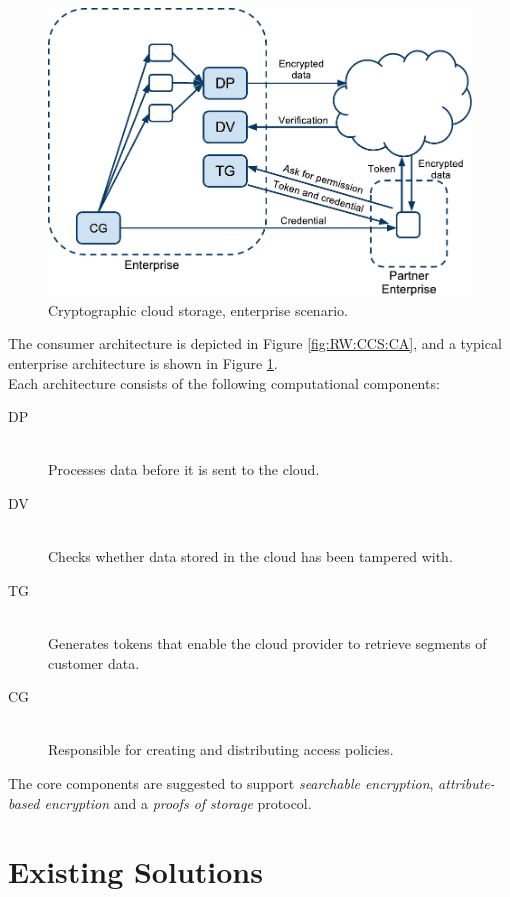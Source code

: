 \documentclass[pdftex,english,10pt,b5paper,twoside]{book}
\begin{document}
\begin{figure}[h!]
    \centering
    \includegraphics[scale=0.6]{ArchitectureCCSE.pdf}
    \caption{Cryptographic cloud storage, enterprise scenario.}
    \label{fig:RW:CCS:EA}
\end{figure}

The consumer architecture is depicted in Figure \ref{fig:RW:CCS:CA}, and a typical
enterprise architecture is shown in Figure \ref{fig:RW:CCS:EA}.\\

\noindent Each architecture consists of the following computational components:
\begin{description}
  \item[\ac{DP}] \hfill \\Processes data before it is sent to the cloud.
  \item[\ac{DV}] \hfill \\Checks whether data stored in the cloud has been
  tampered with.
  \item[\ac{TG}] \hfill \\Generates tokens that enable the cloud provider to
  retrieve segments of customer data.
  \item[\ac{CG}] \hfill \\Responsible for creating and distributing access
  policies.
\end{description}

The core components are suggested to support \emph{searchable encryption},
\emph{attribute-based encryption} and a \emph{proofs of storage} protocol.

\section{Existing Solutions}
\label{sec:existing}
\end{document}
